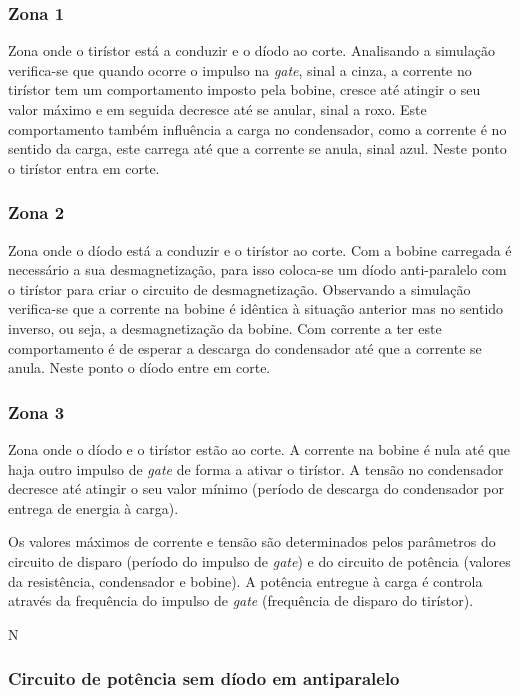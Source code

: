 \documentclass[a4paper,11pt]{article}
\numberwithin{equation}{section}
\begin{document}
\subsubsection*{Zona 1}
	Zona onde o tirístor está a conduzir e o díodo ao corte.
	Analisando a simulação verifica-se que quando ocorre o impulso na \textit{gate}, sinal a cinza, a corrente no tirístor tem um comportamento imposto pela bobine, cresce até atingir o seu valor máximo e em seguida decresce até se anular, sinal a roxo. Este comportamento também influência a carga no condensador, como a corrente é no sentido da carga, este carrega até que a corrente se anula, sinal azul. Neste ponto o tirístor entra em corte.
	   
\subsubsection*{Zona 2}
	Zona onde o díodo está a conduzir e o tirístor ao corte. 
	Com a bobine carregada é necessário a sua desmagnetização, para isso coloca-se um díodo anti-paralelo com o tirístor para criar o circuito de desmagnetização. 
	Observando a simulação verifica-se que a corrente na bobine é idêntica à situação anterior mas no sentido inverso, ou seja, a desmagnetização da bobine. Com corrente a ter este comportamento é de esperar a descarga do condensador até que a corrente se anula. Neste ponto o díodo entre em corte.
	
\subsubsection*{Zona 3}
	Zona onde o díodo e o tirístor estão ao corte.
	A corrente na bobine é nula até que haja outro impulso de \textit{gate} de forma a ativar o tirístor. A tensão no condensador decresce até atingir o seu valor mínimo (período de descarga do condensador por entrega de energia à carga).
	
	Os valores máximos de corrente e tensão são determinados pelos parâmetros do circuito de disparo (período do impulso de \textit{gate}) e do circuito de potência (valores da resistência, condensador e bobine).
	A potência entregue à carga é controla através da frequência  do impulso de \textit{gate} (frequência de disparo do tirístor).




N

\subsubsection{Circuito de potência sem díodo em antiparalelo}
\end{document}

